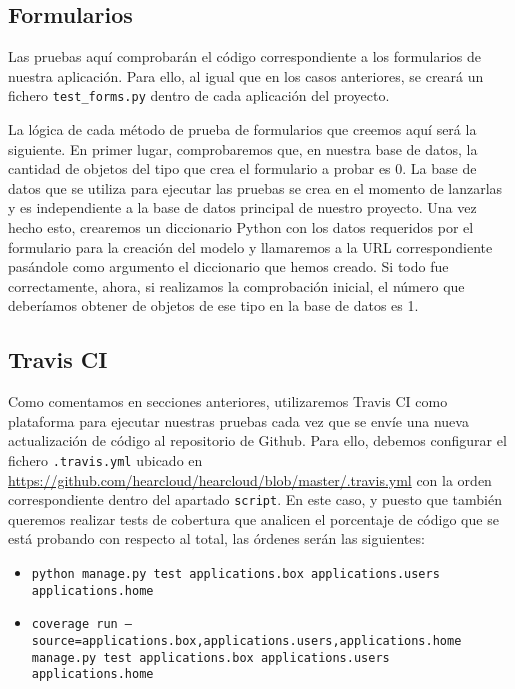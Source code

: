\subsection{Formularios}

Las pruebas aquí comprobarán el código correspondiente a los formularios de nuestra aplicación. Para ello, al igual que en los casos anteriores, se creará un fichero \texttt{test\_forms.py} dentro de cada aplicación del proyecto.

La lógica de cada método de prueba de formularios que creemos aquí será la siguiente. En primer lugar, comprobaremos que, en nuestra base de datos, la cantidad de objetos del tipo que crea el formulario a probar es 0. La base de datos que se utiliza para ejecutar las pruebas se crea en el momento de lanzarlas y es independiente a la base de datos principal de nuestro proyecto. Una vez hecho esto, crearemos un diccionario Python con los datos requeridos por el formulario para la creación del modelo y llamaremos a la URL correspondiente pasándole como argumento el diccionario que hemos creado. Si todo fue correctamente, ahora, si realizamos la comprobación inicial, el número que deberíamos obtener de objetos de ese tipo en la base de datos es 1.

\subsection{Travis CI}

Como comentamos en secciones anteriores, utilizaremos Travis CI como plataforma para ejecutar nuestras pruebas cada vez que se envíe una nueva actualización de código al repositorio de Github. Para ello, debemos configurar el fichero \texttt{.travis.yml} ubicado en \url{https://github.com/hearcloud/hearcloud/blob/master/.travis.yml} con la orden correspondiente dentro del apartado \texttt{script}. En este caso, y puesto que también queremos realizar tests de cobertura \cite{Coveralls} que analicen el porcentaje de código que se está probando con respecto al total, las órdenes serán las siguientes:

\begin{itemize}
	\item \texttt{python manage.py test applications.box applications.users applications.home}
	\item \texttt{coverage run --source=applications.box,applications.users,applications.home manage.py test applications.box applications.users applications.home}
\end{itemize}
